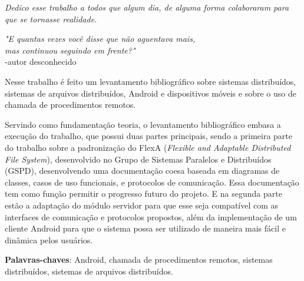 \documentclass[
	12pt,				%
	openright,			%
	oneside,			%
	a4paper,			%
	english,			%
	brazil				%
	]{abntex2}
\begin{document}
\begin{dedicatoria}
   \vspace*{\fill}
   \centering
   \noindent
   \textit{ Dedico esse trabalho a todos que algum dia, de alguma forma colaboraram para que se tornasse realidade.} \vspace*{\fill}
\end{dedicatoria}

\begin{comment}

\begin{agradecimentos}
À minha mãe pela paciência e amor durante todos esses anos.

\end{agradecimentos}

\end{comment}


\begin{epigrafe}
    \vspace*{\fill}
	\begin{flushright}
		\textit{"E quantas vezes você disse que não aguentava mais,\\ mas continuou seguindo em frente?"} \\
		-autor desconhecido
	\end{flushright}
\end{epigrafe}


\setlength{\absparsep}{18pt} %
\begin{resumo}
 
    Nesse trabalho é feito um levantamento bibliográfico sobre sistemas distribuídos, sistemas de arquivos distribuídos, Android e dispositivos móveis e sobre o uso de chamada de procedimentos remotos. 
 
    Servindo como fundamentação teoria, o levantamento bibliográfico embasa a execução do trabalho, que possui duas partes principais, sendo a primeira parte do trabalho sobre a padronização do FlexA (\textit{Flexible and Adaptable Distributed File System}), desenvolvido no Grupo de Sistemas Paralelos e Distribuídos (GSPD), desenvolvendo uma documentação coesa baseada em diagramas de classes, casos de uso funcionais, e protocolos de comunicação. Essa documentação tem como função permitir o progresso futuro do projeto. E na segunda parte estão a adaptação do módulo servidor para que esse seja compatível com as interfaces de comunicação e protocolos propostos, além da implementação de um cliente Android para que o sistema possa ser utilizado de maneira mais fácil e dinâmica pelos usuários.

 \textbf{Palavras-chaves}: Android, chamada de procedimentos remotos, sistemas distribuídos, sistemas de arquivos distribuídos.
\end{resumo}
\end{document}
